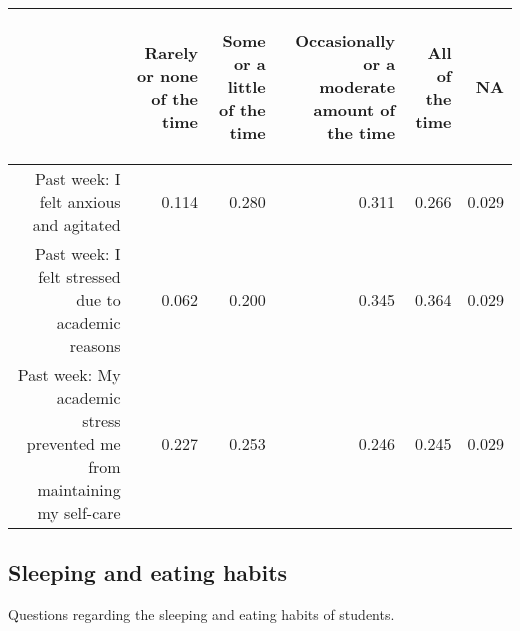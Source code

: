 \documentclass{article}\usepackage[]{graphicx}\usepackage[]{color}
\begin{document}
\begin{table}[ht]
\centering
\begin{tabular}{rrrrrr}
  \hline
 & \begin{sideways} Rarely or none of the time \end{sideways} & \begin{sideways} Some or a little of the time \end{sideways} & \begin{sideways} Occasionally or a moderate amount of the time \end{sideways} & \begin{sideways} All of the time \end{sideways} & \begin{sideways} NA \end{sideways} \\ 
  \hline
Past week: I felt anxious and agitated & 0.114 & 0.280 & 0.311 & 0.266 & 0.029 \\ 
  	Past week: I felt stressed due to academic reasons & 0.062 & 0.200 & 0.345 & 0.364 & 0.029 \\ 
  Past week: My academic stress prevented me from maintaining my self-care & 0.227 & 0.253 & 0.246 & 0.245 & 0.029 \\ 
   \hline
\end{tabular}
\end{table}


\newpage 

\subsection{Sleeping and eating habits}
Questions regarding the sleeping and eating habits of students.
\end{document}
